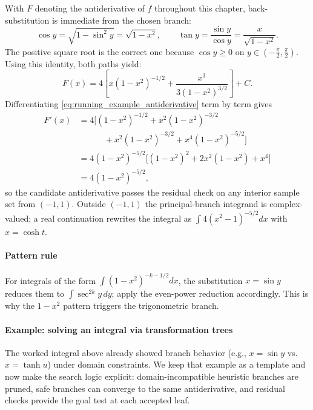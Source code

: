 With \(F\) denoting the antiderivative of \(f\) throughout this chapter, back-substitution is immediate from the chosen branch:
\[
\cos y = \sqrt{1-\sin^2 y} = \sqrt{1-x^2},
\qquad
\tan y = \frac{\sin y}{\cos y} = \frac{x}{\sqrt{1-x^2}}.
\]
The positive square root is the correct one because \(\cos y \ge 0\) on \(y \in \left(-\frac{\pi}{2}, \frac{\pi}{2}\right)\). Using this identity, both paths yield:
\begin{equation}
F(x) = 4 \left[ x (1 - x^2)^{-1/2} + \frac{x^3}{3(1 - x^2)^{3/2}} \right] + C.
\label{eq:running_example_antiderivative}
\end{equation}
Differentiating \eqref{eq:running_example_antiderivative} term by term gives
\[
\begin{aligned}
F'(x)
&= 4\Big[(1-x^2)^{-1/2} + x^2(1-x^2)^{-3/2} \\
&\qquad\quad + x^2(1-x^2)^{-3/2} + x^4(1-x^2)^{-5/2}\Big] \\
&= 4(1-x^2)^{-5/2}\Big[(1-x^2)^2 + 2x^2(1-x^2) + x^4\Big] \\
&= 4(1-x^2)^{-5/2},
\end{aligned}
\]
so the candidate antiderivative passes the residual check on any interior sample set from \((-1,1)\). Outside \((-1,1)\) the principal-branch integrand is complex-valued; a real continuation rewrites the integral as \(\int 4(x^2-1)^{-5/2}dx\) with \(x=\cosh t\).

\paragraph{Pattern rule}
For integrals of the form \(\int (1 - x^2)^{-k-1/2} dx\), the substitution \(x=\sin y\) reduces them to \(\int \sec^{2k} y\, dy\); apply the even-power reduction accordingly. This is why the \(1 - x^2\) pattern triggers the trigonometric branch.

\paragraph{Example: solving an integral via transformation trees}
\label{sec:symbolic_example_solving_an_integral_via_transformation_trees}
The worked integral above already showed branch behavior (e.g., \(x=\sin y\) vs.\ \(x=\tanh u\)) under domain constraints. We keep that example as a template and now make the search logic explicit: domain-incompatible heuristic branches are pruned, safe branches can converge to the same antiderivative, and residual checks provide the goal test at each accepted leaf.

